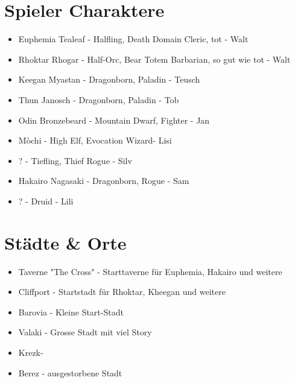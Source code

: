 \documentclass{article}
\begin{document}
\section{Spieler Charaktere}
\begin{itemize}
	\item Euphemia Tealeaf - Halfling, Death Domain Cleric, tot - Walt
	\item Rhoktar Rhogar - Half-Orc, Bear Totem Barbarian, so gut wie tot - Walt
	\item Keegan Myastan - Dragonborn, Paladin - Teusch
	\item Thun Janosch - Dragonborn, Paladin - Tob
	\item Odin Bronzebeard - Mountain Dwarf, Fighter - Jan
	\item Mòchi - High Elf, Evocation Wizard- Lisi
	\item ? - Tiefling, Thief Rogue - Silv
	\item Hakairo Nagasaki - Dragonborn, Rogue - Sam
	\item ? - Druid - Lili
\end{itemize}
\section{Städte \& Orte}
\begin{itemize}
	\item Taverne "The Cross" - Starttaverne für Euphemia, Hakairo und weitere
	\item Cliffport - Startstadt für Rhoktar, Kheegan und weitere
	\item Barovia - Kleine Start-Stadt
	\item Valaki - Grosse Stadt mit viel Story
	\item Krezk-
	\item Berez - ausgestorbene Stadt
\end{itemize}
\end{document}
